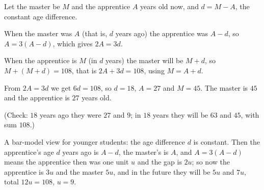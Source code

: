 Let the master be $M$ and the apprentice $A$ years old now, and $d=M-A$, the constant age difference.

When the master was $A$ (that is, $d$ years ago) the apprentice was $A-d$, so $A=3(A-d)$, which gives $2A=3d$.

When the apprentice is $M$ (in $d$ years) the master will be $M+d$, so $M+(M+d)=108$, that is $2A+3d=108$, using $M=A+d$.

From $2A=3d$ we get $6d=108$, so $d=18$, $A=27$ and $M=45$. The master is $\boxed{45}$ and the apprentice is $\boxed{27}$ years old.

(Check: $18$ years ago they were $27$ and $9$; in $18$ years they will be $63$ and $45$, with sum $108$.)

A bar-model view for younger students: the age difference $d$ is constant. Then the apprentice's age $d$ years ago is $A-d$, the master's is $A$, and $A=3(A-d)$ means the apprentice then was one unit $u$ and the gap is $2u$; so now the apprentice is $3u$ and the master $5u$, and in the future they will be $5u$ and $7u$, total $12u=108$, $u=9$.
